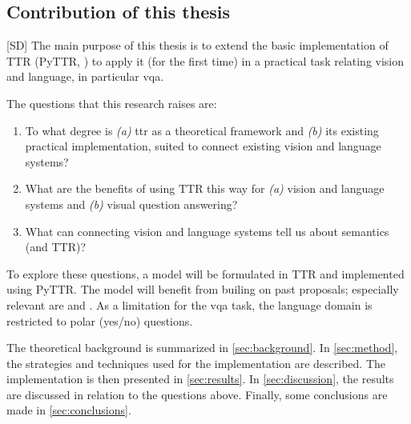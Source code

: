 \subsection{Contribution of this thesis}
\label{sec:contribution}

[SD] The main purpose of this thesis is to extend the basic implementation of TTR (PyTTR, \cite{pyttr}) to apply it (for the first time) in a practical task relating vision and language, in particular \acrfull{vqa}.

The questions that this research raises are:

\begin{enumerate}
\item To what degree is \textit{(a)} \gls{ttr} as a theoretical framework and \textit{(b)} its existing practical implementation, suited to connect existing vision and language systems?
\item What are the benefits of using TTR this way for \textit{(a)} vision and language systems and \textit{(b)} visual question answering?
\item What can connecting vision and language systems tell us about semantics (and TTR)?
\end{enumerate}

To explore these questions, a model will be formulated in TTR and implemented using PyTTR.
The model will benefit from builing on past proposals; especially relevant are \cite{ttrspat} and \cite{lspc}.
As a limitation for the \gls{vqa} task, the language domain is restricted to polar (yes/no) questions.


The theoretical background is summarized in \autoref{sec:background}.
In \autoref{sec:method}, the strategies and techniques used for the implementation are described.
The implementation is then presented in \autoref{sec:results}.
In \autoref{sec:discussion}, the results are discussed in relation to the questions above.
Finally, some conclusions are made in \autoref{sec:conclusions}.
